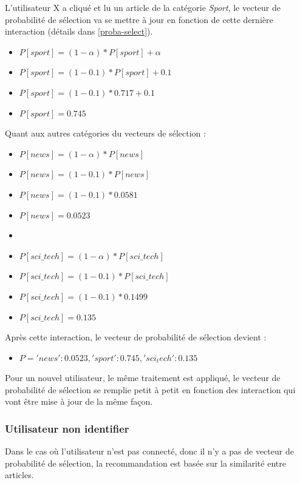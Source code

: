 L'utilisateur X a cliqué et lu un article de la catégorie \emph{Sport}, le vecteur de probabilité de sélection va se mettre à jour en fonction de cette dernière interaction (détails dans \ref{proba-select}).
\begin{itemize}[label={}]
    \item $P[sport] = (1-{\alpha}) * {P[sport]} + {\alpha}$
    \item $P[sport] = (1-{0.1}) * {P[sport]} + {0.1}$
    \item $P[sport] = (1-{0.1}) * {0.717} + {0.1}$
    \item $P[sport] = 0.745$
\end{itemize}

Quant aux autres catégories du vecteurs de sélection :
\begin{itemize}[label={}]
    \item $P[news] = (1-{\alpha}) * {P[news]} $
    \item $P[news] = (1-{0.1}) * {P[news]} $
    \item $P[news] = (1-{0.1}) * {0.0581} $
    \item $P[news] = 0.0523$
    \item 
    \item $P[sci\_tech] = (1-{\alpha}) * {P[sci\_tech]} $
    \item $P[sci\_tech] = (1-{0.1}) * {P[sci\_tech]} $
    \item $P[sci\_tech] = (1-{0.1}) * {0.1499} $
    \item $P[sci\_tech] = 0.135$
\end{itemize}
Après cette interaction, le vecteur de probabilité de sélection devient :
\begin{itemize}[label={}]
    \item $P = {'news': 0.0523, 'sport': 0.745, 'sci_tech': 0.135}$\\
\end{itemize}
Pour un nouvel utilisateur, le même traitement est appliqué, le vecteur de probabilité de sélection se remplie petit à petit en fonction des interaction qui vont être mise à jour de la même façon.

\subsubsection{Utilisateur non identifier}
Dans le cas où l'utilisateur n'est pas connecté, donc il n’y a pas de vecteur de probabilité de sélection, la recommandation est basée sur la similarité entre articles.

